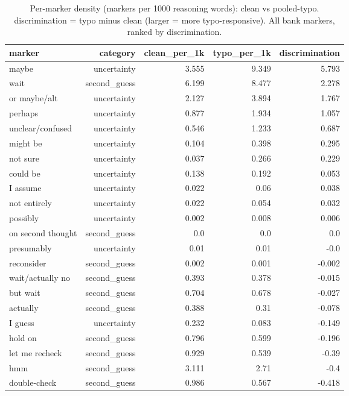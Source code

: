 \documentclass[11pt]{article}
\begin{document}
\begin{table}[H]
\centering
\caption{Per-marker density (markers per 1000 reasoning words): clean vs pooled-typo. discrimination = typo minus clean (larger = more typo-responsive). All bank markers, ranked by discrimination.}
\small
\begin{adjustbox}{max width=\textwidth}
\begin{tabular}{lrrrr}
\toprule
\textbf{marker} & \textbf{category} & \textbf{clean\_per\_1k} & \textbf{typo\_per\_1k} & \textbf{discrimination} \\
\midrule
maybe & uncertainty & 3.555 & 9.349 & 5.793 \\
wait & second\_guess & 6.199 & 8.477 & 2.278 \\
or maybe/alt & uncertainty & 2.127 & 3.894 & 1.767 \\
perhaps & uncertainty & 0.877 & 1.934 & 1.057 \\
unclear/confused & uncertainty & 0.546 & 1.233 & 0.687 \\
might be & uncertainty & 0.104 & 0.398 & 0.295 \\
not sure & uncertainty & 0.037 & 0.266 & 0.229 \\
could be & uncertainty & 0.138 & 0.192 & 0.053 \\
I assume & uncertainty & 0.022 & 0.06 & 0.038 \\
not entirely & uncertainty & 0.022 & 0.054 & 0.032 \\
possibly & uncertainty & 0.002 & 0.008 & 0.006 \\
on second thought & second\_guess & 0.0 & 0.0 & 0.0 \\
presumably & uncertainty & 0.01 & 0.01 & -0.0 \\
reconsider & second\_guess & 0.002 & 0.001 & -0.002 \\
wait/actually no & second\_guess & 0.393 & 0.378 & -0.015 \\
but wait & second\_guess & 0.704 & 0.678 & -0.027 \\
actually & second\_guess & 0.388 & 0.31 & -0.078 \\
I guess & uncertainty & 0.232 & 0.083 & -0.149 \\
hold on & second\_guess & 0.796 & 0.599 & -0.196 \\
let me recheck & second\_guess & 0.929 & 0.539 & -0.39 \\
hmm & second\_guess & 3.111 & 2.71 & -0.4 \\
double-check & second\_guess & 0.986 & 0.567 & -0.418 \\
\bottomrule
\end{tabular}
\end{adjustbox}
\end{table}
\end{document}
